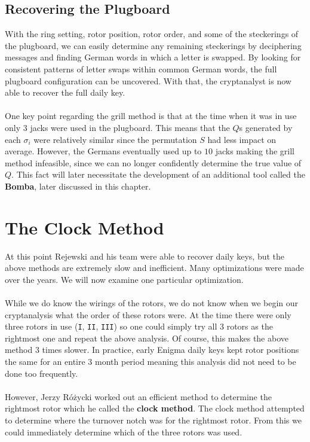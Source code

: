 \subsection{Recovering the Plugboard}
With the ring setting, rotor position, rotor order, and some of the steckerings of the plugboard, we can easily determine any remaining steckerings by deciphering messages and finding German words in which a letter is swapped. By looking for consistent patterns of letter swaps within common German words, the full plugboard configuration can be uncovered. With that, the cryptanalyst is now able to recover the full daily key.
\\\\One key point regarding the grill method is that at the time when
it was in use only $3$ jacks were used in the plugboard. This means
that the $Q$s generated by each $\sigma_i$ were relatively similar
since the permutation $S$ had less impact on average. However, the
Germans eventually used up to $10$ jacks making the grill method
infeasible, since we can no longer confidently determine the true
value of $Q$. This fact will later necessitate the development of an
additional tool called the {\bf{Bomba}}, later discussed in this chapter.
\section{The Clock Method}\label{clock_method}

At this point Rejewski and his team were able to recover daily keys,
but the above methods are extremely slow and inefficient. Many
optimizations were made over the years. We will now examine one
particular optimization.
\\\\While we do know the wirings of the rotors, we do not know when
we begin our cryptanalysis what the order of these rotors were. At
the time there were only three rotors in use (\texttt{I},
\texttt{II}, \texttt{III}) so one could simply try all 3 rotors as
the rightmost one and repeat the above analysis. Of course, this
makes the above method 3 times slower. In practice, early Enigma
daily keys kept rotor positions the same for an entire 3 month period
meaning this analysis did not need to be done too frequently.
\\\\However, Jerzy Różycki worked out an efficient method to
determine the rightmost rotor which he called the {\bf{clock
method}}. The clock method attempted to determine where the turnover
notch was for the rightmost rotor. From this we could immediately
determine which of the three rotors was used.

